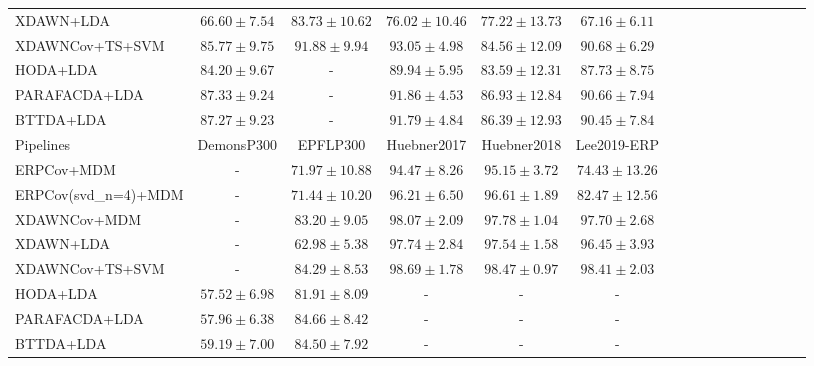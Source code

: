 \begin{tabular}{@{}lccccccccccccccc@{}}
          XDAWN+LDA &          $66.60\pm7.54$ &         $83.73\pm10.62$ &         $76.02\pm10.46$ &          $77.22\pm13.73$ &          $67.16\pm6.11$ \\
    XDAWNCov+TS+SVM &          $85.77\pm9.75$ & \boldmath$91.88\pm9.94$ & \boldmath$93.05\pm4.98$ &          $84.56\pm12.09$ & \boldmath$90.68\pm6.29$ \\
           HODA+LDA &          $84.20\pm9.67$ &                       - &          $89.94\pm5.95$ &          $83.59\pm12.31$ &          $87.73\pm8.75$ \\
      PARAFACDA+LDA & \boldmath$87.33\pm9.24$ &                       - &          $91.86\pm4.53$ & \boldmath$86.93\pm12.84$ &          $90.66\pm7.94$ \\
          BTTDA+LDA &          $87.27\pm9.23$ &                       - &          $91.79\pm4.84$ &          $86.39\pm12.93$ &          $90.45\pm7.84$ \\

\midrule
          Pipelines &              DemonsP300 &                EPFLP300 &             Huebner2017 &             Huebner2018 &             Lee2019-ERP \\
\midrule
         ERPCov+MDM &                       - &         $71.97\pm10.88$ &          $94.47\pm8.26$ &          $95.15\pm3.72$ &         $74.43\pm13.26$ \\
ERPCov(svd_n=4)+MDM &                       - &         $71.44\pm10.20$ &          $96.21\pm6.50$ &          $96.61\pm1.89$ &         $82.47\pm12.56$ \\
       XDAWNCov+MDM &                       - &          $83.20\pm9.05$ &          $98.07\pm2.09$ &          $97.78\pm1.04$ &          $97.70\pm2.68$ \\
          XDAWN+LDA &                       - &          $62.98\pm5.38$ &          $97.74\pm2.84$ &          $97.54\pm1.58$ &          $96.45\pm3.93$ \\
    XDAWNCov+TS+SVM &                       - &          $84.29\pm8.53$ & \boldmath$98.69\pm1.78$ & \boldmath$98.47\pm0.97$ & \boldmath$98.41\pm2.03$ \\
           HODA+LDA &          $57.52\pm6.98$ &          $81.91\pm8.09$ &                       - &                       - &                       - \\
      PARAFACDA+LDA &          $57.96\pm6.38$ & \boldmath$84.66\pm8.42$ &                       - &                       - &                       - \\
          BTTDA+LDA & \boldmath$59.19\pm7.00$ &          $84.50\pm7.92$ &                       - &                       - &                       - \\
\bottomrule
\end{tabular}

